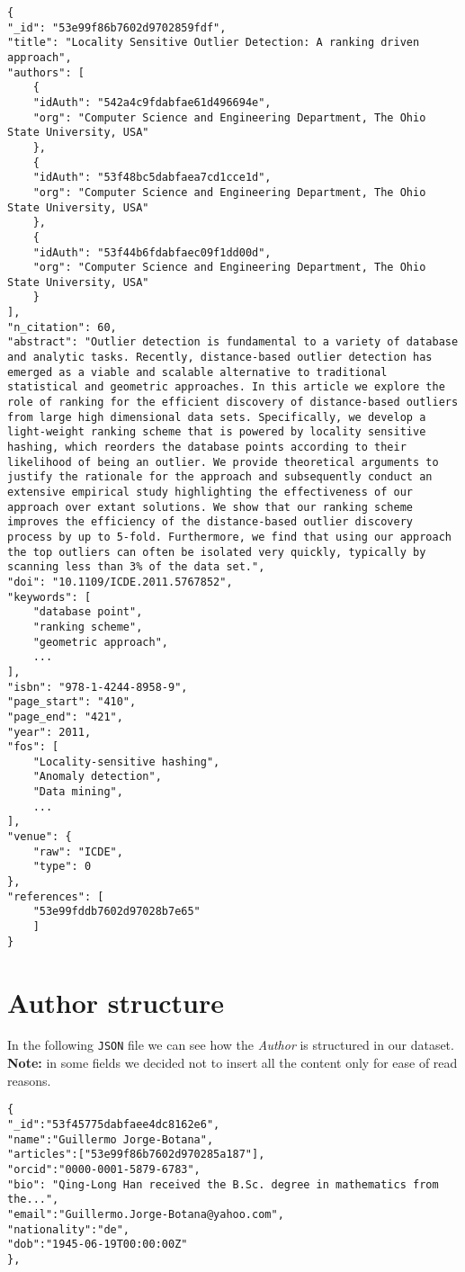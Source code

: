 \documentclass{Configuration_Files/PoliMi3i_thesis}
\begin{document}
\begin{lstlisting}
{
"_id": "53e99f86b7602d9702859fdf",
"title": "Locality Sensitive Outlier Detection: A ranking driven approach",
"authors": [
    {
    "idAuth": "542a4c9fdabfae61d496694e",
    "org": "Computer Science and Engineering Department, The Ohio State University, USA"
    },
    {
    "idAuth": "53f48bc5dabfaea7cd1cce1d",
    "org": "Computer Science and Engineering Department, The Ohio State University, USA"
    },
    {
    "idAuth": "53f44b6fdabfaec09f1dd00d",
    "org": "Computer Science and Engineering Department, The Ohio State University, USA"
    }
],
"n_citation": 60,
"abstract": "Outlier detection is fundamental to a variety of database and analytic tasks. Recently, distance-based outlier detection has emerged as a viable and scalable alternative to traditional statistical and geometric approaches. In this article we explore the role of ranking for the efficient discovery of distance-based outliers from large high dimensional data sets. Specifically, we develop a light-weight ranking scheme that is powered by locality sensitive hashing, which reorders the database points according to their likelihood of being an outlier. We provide theoretical arguments to justify the rationale for the approach and subsequently conduct an extensive empirical study highlighting the effectiveness of our approach over extant solutions. We show that our ranking scheme improves the efficiency of the distance-based outlier discovery process by up to 5-fold. Furthermore, we find that using our approach the top outliers can often be isolated very quickly, typically by scanning less than 3% of the data set.",
"doi": "10.1109/ICDE.2011.5767852",
"keywords": [
    "database point",
    "ranking scheme",
    "geometric approach",
    ...
],
"isbn": "978-1-4244-8958-9",
"page_start": "410",
"page_end": "421",
"year": 2011,
"fos": [
    "Locality-sensitive hashing",
    "Anomaly detection",
    "Data mining",
    ...
],
"venue": {
    "raw": "ICDE",
    "type": 0
},
"references": [
    "53e99fddb7602d97028b7e65"
    ]
}
\end{lstlisting}

\newpage
\section{Author structure}
In the following \verb |JSON| file we can see how the \emph{Author} is structured in our dataset.\newline
\textbf{Note:} in some fields we decided not to insert all the content only for ease of read reasons.
\begin{lstlisting}
{
"_id":"53f45775dabfaee4dc8162e6",
"name":"Guillermo Jorge-Botana",
"articles":["53e99f86b7602d970285a187"],
"orcid":"0000-0001-5879-6783",
"bio": "Qing-Long Han received the B.Sc. degree in mathematics from the...",
"email":"Guillermo.Jorge-Botana@yahoo.com",
"nationality":"de",
"dob":"1945-06-19T00:00:00Z"
},
\end{lstlisting}
\end{document}
